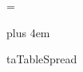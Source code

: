 
\newcount\LineThicknessFactor    
\newcount\StrutHeightFactor      
\newcount\StrutDepthFactor       
\newcount\InterColumnSpaceFactor 
\newcount\ColumnWidthFactor      
\newcount\KernFactor
\newcount\VspaceFactor




\newcount\TracingKeys %
\newcount\TracingFormats  %



\def\BeginTableParBox#1{%
  \vtop\bgroup 
    \hsize=#1
    \normalbaselines 
    \let~=\!ttTie
    \let\-=\!ttDH
    \the\EveryTableParBox} 
  
\def\EndTableParBox{%
    \MakeStrut{0pt}{\StrutDepthFactor\StrutUnit}
  \egroup} %

\newtoks\EveryTableParBox
\EveryTableParBox={%
  \parindent=0pt
  \raggedright
  \rightskip=0pt plus 4em %
  \relax} 



\newtoks\EveryTable
\newtoks\!taTableSpread



\newskip\LeftTabskip
\newskip\RightTabskip



